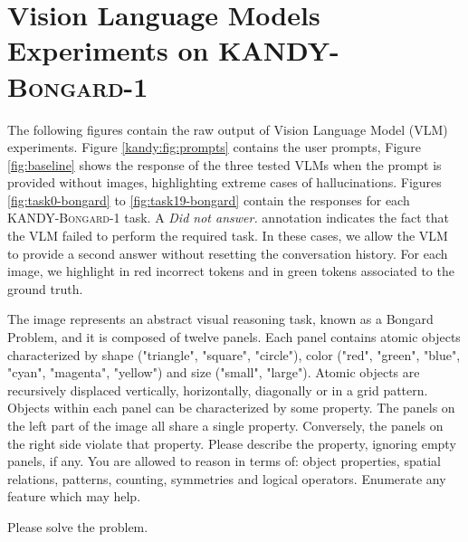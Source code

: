 \chapter{Vision Language Models Experiments on \textsc{KANDY-Bongard-1}}\label{app:bongard}
The following figures contain the raw output of Vision Language Model (VLM) experiments. Figure \ref{kandy:fig:prompts} contains the user prompts, Figure \ref{fig:baseline} shows the response of the three tested VLMs when the prompt is provided without images, highlighting extreme cases of hallucinations. Figures \ref{fig:task0-bongard} to \ref{fig:task19-bongard} contain the responses for each \textsc{KANDY-Bongard-1} task.
A \emph{Did not answer.} annotation indicates the fact that the VLM failed to perform the required task. In these cases, we allow the VLM to provide a second answer without resetting the conversation history.
For each image, we highlight in red incorrect tokens and in green tokens associated to the ground truth.

\begin{tcolorbox}[breakable,enhanced jigsaw,opacityback=0,]
	\centering
	\begin{dialogue}
		 The image represents an abstract visual reasoning task, known as a Bongard Problem, and it is composed of twelve panels. Each panel contains atomic objects characterized by shape ("triangle", "square", "circle"), color ("red", "green", "blue", "cyan", "magenta", "yellow") and size ("small", "large"). Atomic objects are recursively displaced vertically, horizontally, diagonally or in a grid pattern. Objects within each panel can be characterized by some property. The panels on the left part of the image all share a single property. Conversely, the panels on the right side violate that property. Please describe the property, ignoring empty panels, if any. You are allowed to reason in terms of: object properties, spatial relations, patterns, counting, symmetries and logical operators. Enumerate any feature which may help.
		
		\vspace{1em}
		\vspace{1em}
		 Please solve the problem.
	\end{dialogue}
	\label{kandy:fig:prompts}
\end{tcolorbox}

